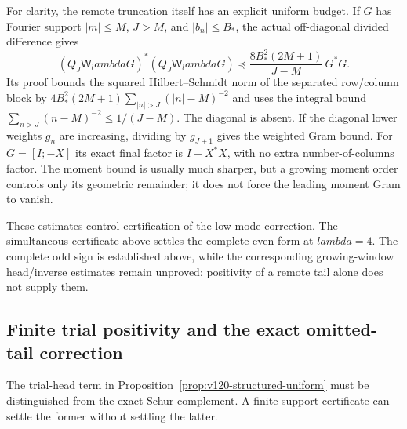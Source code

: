 \documentclass[11pt]{article}
\def\lambda{lambda}%
\theoremstyle{remark}
\begin{document}
For clarity, the remote truncation itself has an explicit uniform
budget. If $G$ has Fourier support $|m|\le M$, $J>M$, and
$|b_n|\le B_*$, the actual off-diagonal divided difference gives
\begin{equation}\label{eq:v120-separated-uniform-budget}
 (Q_J\mathsf W_\lambda G)^*(Q_J\mathsf W_\lambda G)
 \preceq\frac{8B_*^2(2M+1)}{J-M}\,G^*G.
\end{equation}
Its proof bounds the squared Hilbert--Schmidt norm of the separated
row/column block by
$4B_*^2(2M+1)\sum_{|n|>J}(|n|-M)^{-2}$ and uses the
integral bound $\sum_{n>J}(n-M)^{-2}\le1/(J-M)$.
The diagonal is absent. If the diagonal lower weights $g_n$ are increasing,
dividing by $g_{J+1}$ gives the weighted Gram bound. For
$G=[I;-X]$ its exact final factor is $I+X^*X$, with no extra
number-of-columns factor. The moment bound is usually much sharper,
but a growing moment order controls only its geometric remainder;
it does not force the leading moment Gram to vanish.

These estimates control certification of the low-mode correction.
The simultaneous certificate above settles the complete even form at
$\lambda=4$. The complete odd sign is established above, while the corresponding
growing-window head/inverse estimates remain unproved; positivity of a remote tail
alone does not supply them.


\subsection{Finite trial positivity and the exact omitted-tail correction}

The trial-head term in Proposition~\ref{prop:v120-structured-uniform}
must be distinguished from the exact Schur complement. A finite-support
certificate can settle the former without settling the latter.
\end{document}
